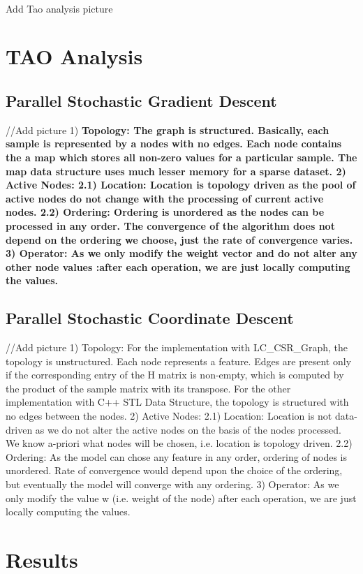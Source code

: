 \documentclass{sigplanconf}
\begin{document}
\\Add Tao analysis picture
\section{TAO Analysis}
\subsection{Parallel Stochastic Gradient Descent}
//Add picture
1) \bf{Topology}: The graph is structured. Basically, each sample is represented by a nodes with no edges. Each node contains the
a map which stores all non-zero values for a particular sample. The map data structure uses much lesser memory for a sparse dataset. 
2) \bf{Active Nodes}:
2.1) \bf{Location}: Location is topology driven as the pool of active nodes do not change with the
processing of current active nodes.
2.2) \bf{Ordering}: Ordering is unordered as the nodes can be processed in any order. The convergence of the algorithm does not 
depend on the ordering we choose, just the rate of convergence varies.
3) \bf{Operator}: As we only modify the weight vector and do not alter any other node values :after each operation, we are just
locally computing the values.

\subsection{Parallel Stochastic Coordinate Descent}
//Add picture
1) Topology: For the implementation with LC\_CSR\_Graph, the topology is unstructured. Each node represents a feature. Edges are present only if the corresponding entry of the H matrix is non-empty, which is computed by the product of the sample matrix with its transpose. For the other implementation with C++ STL Data Structure, the topology is structured with no edges between the nodes.
2) Active Nodes:
2.1) Location: Location is not data-driven as we do not alter the active nodes on the basis of the
nodes processed. We know a-priori what nodes will be chosen, i.e. location is topology driven.
2.2) Ordering: As the model can chose any feature in any order, ordering of nodes is unordered. Rate
of convergence would depend upon the choice of the ordering, but eventually the model will converge
with any ordering.
3) Operator: As we only modify the value w (i.e. weight of the node) after each operation, we are just
locally computing the values.

\section{Results}
\end{document}
